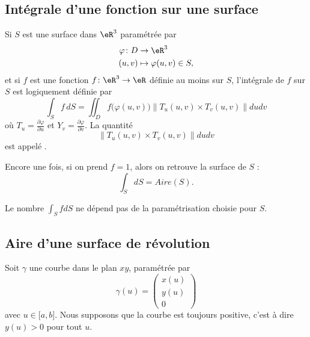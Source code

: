 \subsection{Intégrale d'une fonction sur une surface}

Si $S$ est une surface dans $\eR^3$ paramétrée par
\begin{equation}
    \begin{aligned}
        \varphi\colon D&\to \eR^3 \\
        (u,v)&\mapsto \varphi(u,v)\in S,
    \end{aligned}
\end{equation}
et si $f$ est une fonction $f\colon \eR^3\to \eR$ définie au moins sur $S$, l'intégrale de $f$ sur $S$ est logiquement définie par
\begin{equation}
    \int_S f\,dS=\iint_D f\big( \varphi(u,v) \big)\| T_u(u,v)\times T_v(u,v) \|dudv
\end{equation}
où $T_u=\frac{ \partial \varphi }{ \partial u }$ et $Y_v=\frac{ \partial \varphi }{ \partial v }$. La quantité
\begin{equation}
    \| T_u(u,v)\times T_v(u,v) \|dudv
\end{equation}
est appelé .

Encore une fois, si on prend $f=1$, alors on retrouve la surface de $S$ :
\begin{equation}
    \int_SdS=Aire(S).
\end{equation}

\begin{remark}
    Le nombre $\int_SfdS$ ne dépend pas de la paramétrisation choisie pour $S$.
\end{remark}

\subsection{Aire d'une surface de révolution}

Soit $\gamma$ une courbe dans le plan $xy$, paramétrée par
\begin{equation}
    \gamma(u)=\begin{pmatrix}
        x(u)    \\ 
        y(u)    \\ 
        0    
    \end{pmatrix}
\end{equation}
avec $u\in\mathopen[ a , b \mathclose]$. Nous supposons que la courbe est toujours positive, c'est à dire $y(u)>0$ pour tout $u$.

